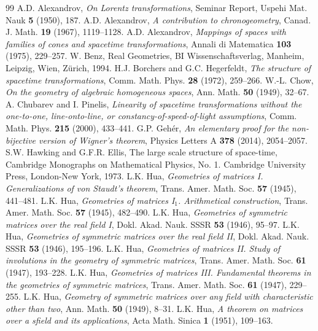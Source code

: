 \documentclass[10pt,a4paper]{amsart}
\theoremstyle{definition}
\theoremstyle{remark}
\numberwithin{subsection}{section}
\numberwithin{equation}{section}
\begin{document}
\begin{thebibliography}{99}
 A.D. Alexandrov, \emph{On Lorentz transformations}, Seminar Report, Uspehi Mat. Nauk \textbf{5} (1950), 187.
 A.D. Alexandrov, \emph{A contribution to chronogeometry}, Canad. J. Math. \textbf{19} (1967), 1119--1128.
 A.D. Alexandrov, \emph{Mappings of spaces with families of cones and spacetime transformations}, Annali di Matematica \textbf{103} (1975), 229--257.
 W. Benz, Real Geometries, BI Wissenschaftsverlag, Manheim, Leipzig, Wien, Z\" urich, 1994.
 H.J. Borchers and G.C. Hegerfeldt, \emph{The structure of spacetime transformations}, Comm. Math. Phys. \textbf{28} (1972), 259--266.
 W.-L. Chow, \emph{On the geometry of algebraic homogeneous spaces}, Ann. Math. \textbf{50} (1949), 32--67.
 A. Chubarev and I. Pinelis, \emph{Linearity of spacetime transformations without the one-to-one, line-onto-line, or constancy-of-speed-of-light assumptions}, Comm. Math. Phys. \textbf{215} (2000), 433--441.
 G.P. Geh\' er, \emph{An elementary proof for the non-bijective version of Wigner's theorem}, Physics Letters A \textbf{378} (2014), 2054--2057.
 S.W. Hawking and G.F.R. Ellis, The large scale structure of space-time, Cambridge Monographs on Mathematical Physics, No. 1. Cambridge University Press, London-New York, 1973.
 L.K. Hua, \emph{Geometries of matrices I. Generalizations of von Staudt's theorem}, Trans. Amer. Math. Soc. \textbf{57} (1945), 441--481.
 L.K. Hua, \emph{Geometries of matrices I$_1$. Arithmetical construction}, Trans. Amer. Math. Soc. \textbf{57} (1945), 482--490.
 L.K. Hua, \emph{Geometries of symmetric matrices over the real field I}, Dokl. Akad. Nauk. SSSR \textbf{53} (1946), 95--97.
 L.K. Hua, \emph{Geometries of symmetric matrices over the real field II}, Dokl. Akad. Nauk. SSSR \textbf{53} (1946), 195--196.
 L.K. Hua, \emph{Geometries of matrices II. Study of involutions in the geometry of symmetric matrices}, Trans. Amer. Math. Soc. \textbf{61} (1947), 193--228.
 L.K. Hua, \emph{Geometries of matrices III. Fundamental theorems in the geometries of symmetric matrices}, Trans. Amer. Math. Soc. \textbf{61} (1947), 229--255.
 L.K. Hua, \emph{Geometry of symmetric matrices over any field with characteristic other than two}, Ann. Math. \textbf{50} (1949), 8--31.
 L.K. Hua, \emph{A theorem on matrices over a sfield and its applications}, Acta Math. Sinica \textbf{1} (1951), 109--163.

\end{thebibliography}
\end{document}
